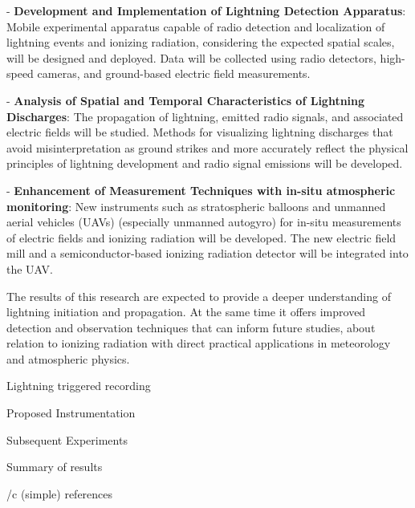 \begitems
\item - {\bf Development and Implementation of Lightning Detection Apparatus}: Mobile experimental apparatus capable of radio detection and localization of lightning events and ionizing radiation, considering the expected spatial scales, will be designed and deployed. Data will be collected using radio detectors, high-speed cameras, and ground-based electric field measurements.
\item - {\bf Analysis of Spatial and Temporal Characteristics of Lightning Discharges}: The propagation of lightning, emitted radio signals, and associated electric fields will be studied. Methods for visualizing lightning discharges that avoid misinterpretation as ground strikes and more accurately reflect the physical principles of lightning development and radio signal emissions will be developed.
\item - {\bf Enhancement of Measurement Techniques with in-situ atmospheric monitoring}: New instruments such as stratospheric balloons and unmanned aerial vehicles (UAVs) (especially unmanned autogyro) for in-situ measurements of electric fields and ionizing radiation will be developed. The new electric field mill and a semiconductor-based ionizing radiation detector will be integrated into the UAV.
\enditems

The results of this research are expected to provide a deeper understanding of lightning initiation and propagation. At the same time it offers improved detection and observation techniques that can inform future studies, about relation to ionizing radiation with direct practical applications in meteorology and atmospheric physics.

 

\chap Lightning triggered recording 

 

\chap Proposed Instrumentation

 

\chap Subsequent Experiments

 

\chap Summary of results

 

\bibchap
\usebib/c (simple) references

\bye
